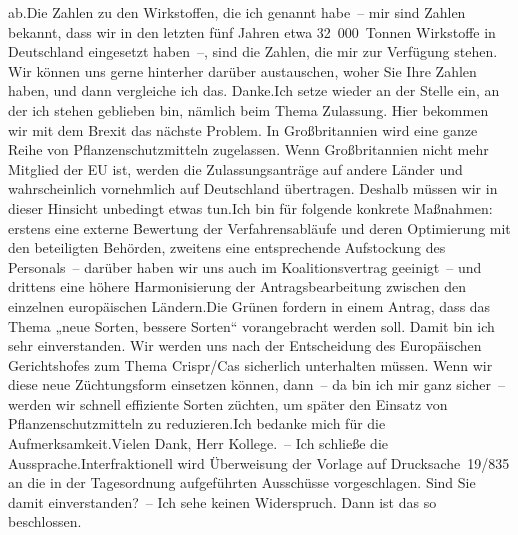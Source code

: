 \documentclass{article}
\begin{document}
ab.Die Zahlen zu den Wirkstoffen, die ich genannt habe – mir sind Zahlen bekannt, dass wir in den letzten fünf Jahren etwa 32 000 Tonnen Wirkstoffe in Deutschland eingesetzt haben –, sind die Zahlen, die mir zur Verfügung stehen. Wir können uns gerne hinterher darüber austauschen, woher Sie Ihre Zahlen haben, und dann vergleiche ich das. Danke.Ich setze wieder an der Stelle ein, an der ich stehen geblieben bin, nämlich beim Thema Zulassung. Hier bekommen wir mit dem Brexit das nächste Problem. In Großbritannien wird eine ganze Reihe von Pflanzenschutzmitteln zugelassen. Wenn Großbritannien nicht mehr Mitglied der EU ist, werden die Zulassungsanträge auf andere Länder und wahrscheinlich vornehmlich auf Deutschland übertragen. Deshalb müssen wir in dieser Hinsicht unbedingt etwas tun.Ich bin für folgende konkrete Maßnahmen: erstens eine externe Bewertung der Verfahrensabläufe und deren Optimierung mit den beteiligten Behörden, zweitens eine entsprechende Aufstockung des Personals – darüber haben wir uns auch im Koalitionsvertrag geeinigt – und drittens eine höhere Harmonisierung der Antragsbearbeitung zwischen den einzelnen europäischen Ländern.Die Grünen fordern in einem Antrag, dass das Thema „neue Sorten, bessere Sorten“ vorangebracht werden soll. Damit bin ich sehr einverstanden. Wir werden uns nach der Entscheidung des Europäischen Gerichtshofes zum Thema Crispr/Cas sicherlich unterhalten müssen. Wenn wir diese neue Züchtungsform einsetzen können, dann – da bin ich mir ganz sicher – werden wir schnell effiziente Sorten züchten, um später den Einsatz von Pflanzenschutzmitteln zu reduzieren.Ich bedanke mich für die Aufmerksamkeit.Vielen Dank, Herr Kollege. – Ich schließe die Aussprache.Interfraktionell wird Überweisung der Vorlage auf Drucksache 19/835 an die in der Tagesordnung aufgeführten Ausschüsse vorgeschlagen. Sind Sie damit einverstanden? – Ich sehe keinen Widerspruch. Dann ist das so beschlossen.
\end{document}
